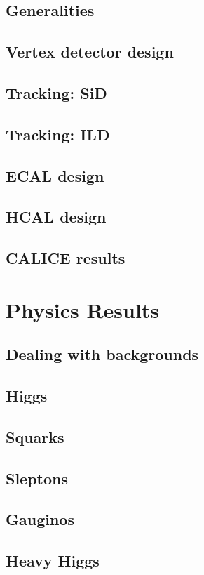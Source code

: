 \documentclass{beamer}
\begin{document}
\subsection{Generalities}%
\subsection{Vertex detector design}%
\subsection{Tracking: SiD}%
\subsection{Tracking: ILD}%
\subsection{ECAL design}%
\subsection{HCAL design}%
\subsection{CALICE results}%

\section{Physics Results}
\subsection{Dealing with backgrounds}%
\subsection{Higgs}%
\subsection{Squarks}%
\subsection{Sleptons}%
\subsection{Gauginos}%
\subsection{Heavy Higgs}%
\end{document}
